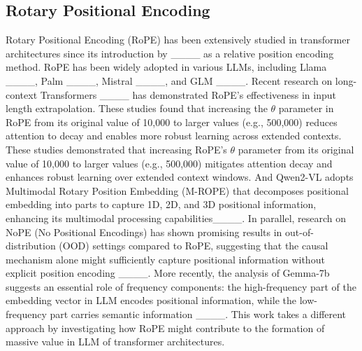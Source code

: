 \subsection{Rotary Positional Encoding}
Rotary Positional Encoding (RoPE) has been extensively studied in transformer architectures since its introduction by ____ as a relative position encoding method. RoPE has been widely adopted in various LLMs, including Llama ____, Palm ____, Mistral ____, and GLM ____. Recent research on long-context Transformers ____ has demonstrated RoPE's effectiveness in input length extrapolation. These studies found that increasing the $\theta$ parameter in RoPE from its original value of 10,000 to larger values (e.g., 500,000) reduces attention to decay and enables more robust learning across extended contexts. These studies demonstrated that increasing RoPE's $\theta$ parameter from its original value of 10,000 to larger values (e.g., 500,000) mitigates attention decay and enhances robust learning over extended context windows. And Qwen2-VL adopts Multimodal Rotary Position Embedding (M-ROPE) that decomposes positional embedding into parts to capture 1D, 2D, and 3D positional information, enhancing its multimodal processing capabilities____. In parallel, research on NoPE (No Positional Encodings) has shown promising results in out-of-distribution (OOD) settings compared to RoPE, suggesting that the causal mechanism alone might sufficiently capture positional information without explicit position encoding ____. More recently, the analysis of Gemma-7b suggests an essential role of frequency components: the high-frequency part of the embedding vector in LLM encodes positional information, while the low-frequency part carries semantic information ____. This work takes a different approach by investigating how RoPE might contribute to the formation of massive value in LLM of transformer architectures.